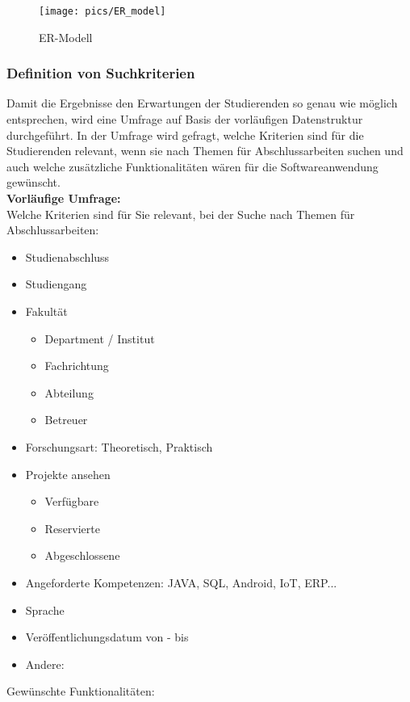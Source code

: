 \cleardoublepage
\begin{figure}[hp]%
    \centering
    \texttt{[image: pics/ER\_model]}\\
    \caption{ER-Modell}
\end{figure}


\subsubsection{Definition von Suchkriterien}
Damit die Ergebnisse den Erwartungen der Studierenden so genau wie möglich entsprechen, wird eine Umfrage auf Basis der vorläufigen Datenstruktur durchgeführt.
In der Umfrage wird gefragt, welche Kriterien sind für die Studierenden relevant, wenn sie nach Themen für Abschlussarbeiten suchen und auch welche zusätzliche Funktionalitäten wären für die Softwareanwendung gewünscht.\\

\newpage
\textbf{Vorläufige Umfrage:}\\

Welche Kriterien sind für Sie relevant, bei der Suche nach Themen für Abschlussarbeiten:
	
	\begin{itemize}
	\item Studienabschluss
	\item Studiengang
	\item Fakultät
		\begin{itemize}[noitemsep]
			\item Department / Institut
			\item Fachrichtung
			\item Abteilung
			\item Betreuer
		\end{itemize}
	\item Forschungsart: Theoretisch, Praktisch
	\item Projekte ansehen
		\begin{itemize}[noitemsep]
			\item Verfügbare
			\item Reservierte
			\item Abgeschlossene
		\end{itemize}
	\item Angeforderte Kompetenzen: JAVA, SQL, Android, IoT, ERP{...}
	\item Sprache
	\item Veröffentlichungsdatum von - bis
	\item Andere:
	\end{itemize}
Gewünschte Funktionalitäten:
	
